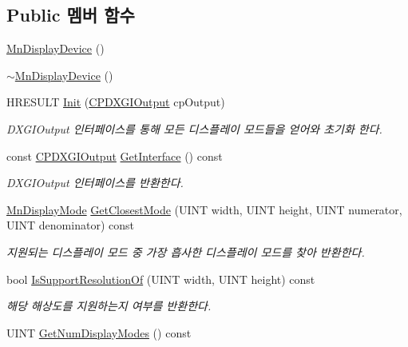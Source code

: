 \subsection*{Public 멤버 함수}
\begin{DoxyCompactItemize}
\item 
\hyperlink{class_m_n_l_1_1_mn_display_device_af7f8cbdfc1a219e619930df164ef1b1b}{Mn\+Display\+Device} ()
\item 
\hyperlink{class_m_n_l_1_1_mn_display_device_a482d7838429f83ed1676d6a784dade88}{$\sim$\+Mn\+Display\+Device} ()
\item 
H\+R\+E\+S\+U\+LT \hyperlink{class_m_n_l_1_1_mn_display_device_a59739c090a5a2a6b704d93622a22f6ef}{Init} (\hyperlink{namespace_m_n_l_ac03add2215d9e5f2938af7887c5b09de}{C\+P\+D\+X\+G\+I\+Output} cp\+Output)
\begin{DoxyCompactList}\small\item\em D\+X\+G\+I\+Output 인터페이스를 통해 모든 디스플레이 모드들을 얻어와 초기화 한다. \end{DoxyCompactList}\item 
const \hyperlink{namespace_m_n_l_ac03add2215d9e5f2938af7887c5b09de}{C\+P\+D\+X\+G\+I\+Output} \hyperlink{class_m_n_l_1_1_mn_display_device_a38f042976af5b2ff72ba37c545fa9895}{Get\+Interface} () const
\begin{DoxyCompactList}\small\item\em D\+X\+G\+I\+Output 인터페이스를 반환한다. \end{DoxyCompactList}\item 
\hyperlink{struct_m_n_l_1_1_mn_display_mode}{Mn\+Display\+Mode} \hyperlink{class_m_n_l_1_1_mn_display_device_a8190e43b743203ccd485061df6e37565}{Get\+Closest\+Mode} (U\+I\+NT width, U\+I\+NT height, U\+I\+NT numerator, U\+I\+NT denominator) const
\begin{DoxyCompactList}\small\item\em 지원되는 디스플레이 모드 중 가장 흡사한 디스플레이 모드를 찾아 반환한다. \end{DoxyCompactList}\item 
bool \hyperlink{class_m_n_l_1_1_mn_display_device_a4180fb0187da5e3751bca74fb46880a3}{Is\+Support\+Resolution\+Of} (U\+I\+NT width, U\+I\+NT height) const
\begin{DoxyCompactList}\small\item\em 해당 해상도를 지원하는지 여부를 반환한다. \end{DoxyCompactList}\item 
U\+I\+NT \hyperlink{class_m_n_l_1_1_mn_display_device_a11b7ecaf93de4b94fd563a4e0cbebd80}{Get\+Num\+Display\+Modes} () const
\end{DoxyCompactItemize}
